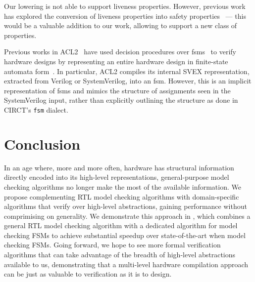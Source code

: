 \documentclass[acmsmall,screen,review]{acmart}
\begin{document}
Our lowering is not able to support liveness properties.
However, previous work has explored the conversion of liveness properties into safety properties~\cite{biere2002liveness, padon2017liveness} --- this would be a valuable addition to our work, allowing \toolname{} to support a new class of properties.

Previous works in ACL2~\cite{kaufmann1996acl2} have used decision procedures over \acp{fsm}~\cite{hunt2006sat} to verify hardware designs by representing an entire hardware design in finite-state automata form~\cite{hunt2017industrial}.
In particular, ACL2 compiles its internal SVEX representation, extracted from Verilog or SystemVerilog, into an \ac{fsm}.
However, this is an implicit representation of \acp{fsm} and mimics the structure of assignments seen in the SystemVerilog input, rather than explicitly outlining the structure as done in CIRCT's \texttt{fsm} dialect.

\section{Conclusion}
In an age where, more and more often, hardware has structural information directly encoded into its high-level representations, general-purpose model checking algorithms no longer make the most of the available information.
We propose complementing RTL model checking algorithms with domain-specific algorithms that verify over high-level abstractions, gaining performance without comprimising on generality.
We demonstrate this approach in \toolname{}, which combines a general RTL model checking algorithm with a dedicated algorithm for model checking FSMs to achieve substantial speedup over state-of-the-art when model checking FSMs.
Going forward, we hope to see more formal verification algorithms that can take advantage of the breadth of high-level abstractions available to us, demonstrating that a multi-level hardware compilation approach can be just as valuable to verification as it is to design.
\newpage
\end{document}
